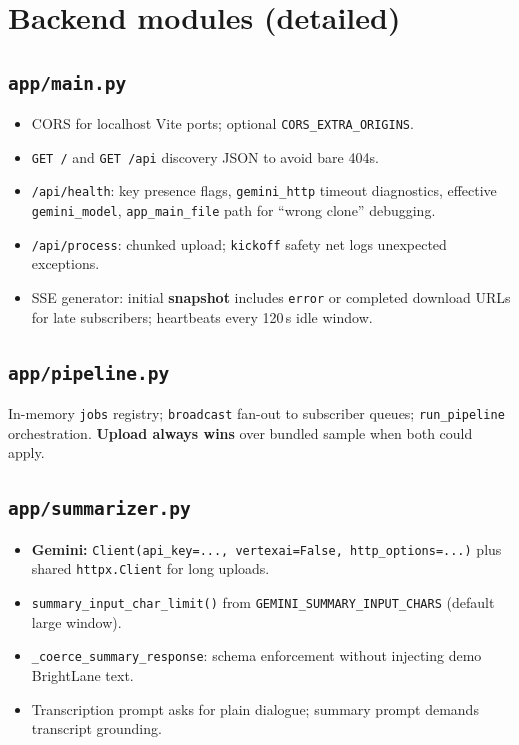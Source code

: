 \documentclass[11pt,a4paper]{article}
\begin{document}
\section{Backend modules (detailed)}

\subsection{\texttt{app/main.py}}
\begin{itemize}
  \item CORS for localhost Vite ports; optional \texttt{CORS\_EXTRA\_ORIGINS}.
  \item \texttt{GET /} and \texttt{GET /api} discovery JSON to avoid bare 404s.
  \item \texttt{/api/health}: key presence flags, \texttt{gemini\_http} timeout diagnostics, effective \texttt{gemini\_model}, \texttt{app\_main\_file} path for ``wrong clone'' debugging.
  \item \texttt{/api/process}: chunked upload; \texttt{kickoff} safety net logs unexpected exceptions.
  \item SSE generator: initial \textbf{snapshot} includes \texttt{error} or completed download URLs for late subscribers; heartbeats every 120\,s idle window.
\end{itemize}

\subsection{\texttt{app/pipeline.py}}
In-memory \texttt{jobs} registry; \texttt{broadcast} fan-out to subscriber queues; \texttt{run\_pipeline} orchestration. \textbf{Upload always wins} over bundled sample when both could apply.

\subsection{\texttt{app/summarizer.py}}
\begin{itemize}
  \item \textbf{Gemini:} \texttt{Client(api\_key=..., vertexai=False, http\_options=...)} plus shared \texttt{httpx.Client} for long uploads.
  \item \texttt{summary\_input\_char\_limit()} from \texttt{GEMINI\_SUMMARY\_INPUT\_CHARS} (default large window).
  \item \texttt{\_coerce\_summary\_response}: schema enforcement without injecting demo BrightLane text.
  \item Transcription prompt asks for plain dialogue; summary prompt demands transcript grounding.
\end{itemize}
\end{document}
